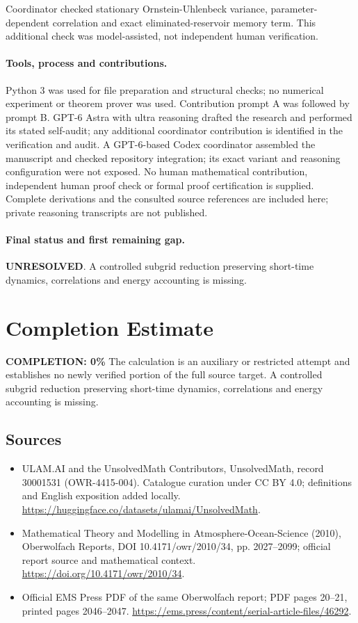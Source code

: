 \documentclass[11pt]{article}
\begin{document}
Coordinator checked stationary Ornstein-Uhlenbeck variance, parameter-dependent correlation and exact eliminated-reservoir memory term. This additional check was model-assisted, not independent human verification.

\paragraph{Tools, process and contributions.}
Python 3 was used for file preparation and structural checks; no numerical experiment or theorem prover was used. Contribution prompt A was followed by prompt B. GPT-6 Astra with ultra reasoning drafted the research and performed its stated self-audit; any additional coordinator contribution is identified in the verification and audit. A GPT-6-based Codex coordinator assembled the manuscript and checked repository integration; its exact variant and reasoning configuration were not exposed. No human mathematical contribution, independent human proof check or formal proof certification is supplied. Complete derivations and the consulted source references are included here; private reasoning transcripts are not published.

\paragraph{Final status and first remaining gap.}
\textbf{UNRESOLVED}. A controlled subgrid reduction preserving short-time dynamics, correlations and energy accounting is missing.

\section{Completion Estimate}
\noindent\textbf{COMPLETION: 0\%}
The calculation is an auxiliary or restricted attempt and establishes no newly verified portion of the full source target. A controlled subgrid reduction preserving short-time dynamics, correlations and energy accounting is missing.

\subsection{Sources}
\begin{itemize}
\item[\hypertarget{source:30001531:1}{S1}] ULAM.AI and the UnsolvedMath Contributors, UnsolvedMath, record 30001531 (OWR-4415-004). Catalogue curation under CC BY 4.0; definitions and English exposition added locally.
\url{https://huggingface.co/datasets/ulamai/UnsolvedMath}.
\item[\hypertarget{source:30001531:2}{S2}] Mathematical Theory and Modelling in Atmosphere-Ocean-Science (2010), Oberwolfach Reports, DOI 10.4171/owr/2010/34, pp. 2027--2099; official report source and mathematical context.
\url{https://doi.org/10.4171/owr/2010/34}.
\item[\hypertarget{source:30001531:3}{S3}] Official EMS Press PDF of the same Oberwolfach report; PDF pages 20--21, printed pages 2046--2047.
\url{https://ems.press/content/serial-article-files/46292}.
\end{itemize}
\label{end:30001531}
\end{document}
